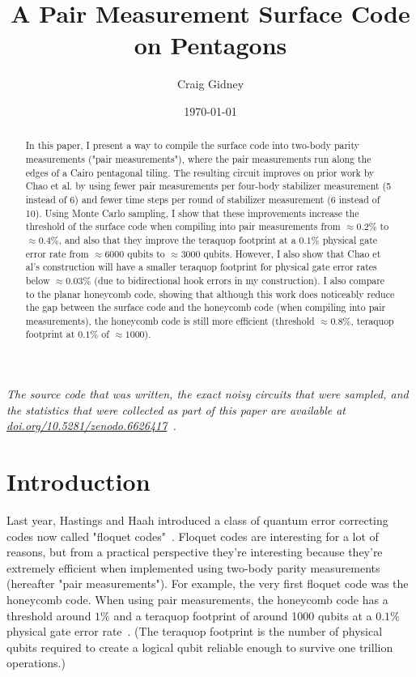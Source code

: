 \documentclass[onecolumn,unpublished,a4paper]{quantumarticle}
\theoremstyle{definition}
\theoremstyle{definition}
\theoremstyle{definition}
\begin{document}
\title{A Pair Measurement Surface Code on Pentagons}

\date{\today}
\author{Craig Gidney}

\begin{abstract}
In this paper, I present a way to compile the surface code into two-body parity measurements ("pair measurements"), where the pair measurements run along the edges of a Cairo pentagonal tiling.
The resulting circuit improves on prior work by Chao et al. by using fewer pair measurements per four-body stabilizer measurement (5 instead of 6) and fewer time steps per round of stabilizer measurement (6 instead of 10).
Using Monte Carlo sampling, I show that these improvements increase the threshold of the surface code when compiling into pair measurements from $\approx 0.2\%$ to $\approx 0.4\%$, and also that they improve the teraquop footprint at a $0.1\%$ physical gate error rate from $\approx6000$ qubits to $\approx3000$ qubits.
However, I also show that Chao et al's construction will have a smaller teraquop footprint for physical gate error rates below $\approx 0.03\%$ (due to bidirectional hook errors in my construction).
I also compare to the planar honeycomb code, showing that although this work does noticeably reduce the gap between the surface code and the honeycomb code (when compiling into pair measurements), the honeycomb code is still more efficient (threshold $\approx 0.8\%$, teraquop footprint at $0.1\%$ of $\approx 1000$).
\end{abstract}

\maketitle

\emph{The source code that was written, the exact noisy circuits that were sampled, and the statistics that were collected as part of this paper are available at \href{https://doi.org/10.5281/zenodo.6626417}{doi.org/10.5281/zenodo.6626417}~\cite{craig_gidney_2022_6626417}.}

\section{Introduction}
\label{sec:introduction}

Last year, Hastings and Haah introduced a class of quantum error correcting codes now called "floquet codes"~\cite{hastings2021dynamically}.
Floquet codes are interesting for a lot of reasons, but from a practical perspective they're interesting because they're extremely efficient when implemented using two-body parity measurements (hereafter "pair measurements").
For example, the very first floquet code was the honeycomb code.
When using pair measurements, the honeycomb code has a threshold around $1\%$ and a teraquop footprint of around 1000 qubits at a $0.1\%$ physical gate error rate~\cite{gidney2022planarhoneycomb,paetznick2022floquetmajoranaperformance,chao2020optimization}.
(The teraquop footprint is the number of physical qubits required to create a logical qubit reliable enough to survive one trillion operations.)
\end{document}
